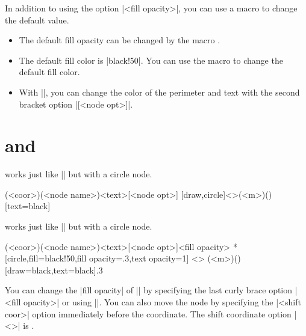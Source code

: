 \remark
In addition to using the option |{<fill opacity>}|, you can use a macro to change the default value.
\begin{itemize}
\item The default fill opacity can be changed by the macro \icmd{\settzfillopacity}.
\item
The default fill color is |black!50|. You can use the macro \icmd{\settzfillcolor} to change the default fill color.
\item With |\tznodeframe|, you can change the color of the perimeter and text with the second bracket option |[<node opt>]|.
\end{itemize}


\section{\protect\cmd{\tznodecircle} and \protect\cmd{\tznodecircle*}}
\label{s:tznodecircle}

\icmd{\tznodecircle} works just like |\tznodeframe| but with a circle node.

\begin{tzdef}
(<coor>)(<node name>){<text>}[<node opt>]
  [draw,circle]<>(<m>)(){}[text=black]
\end{tzdef}

\icmd{\tznodecircle*} works just like |\tznodeframe*| but with a circle node.

\begin{tzdef}
              (<coor>)(<node name>){<text>}[<node opt>]{<fill opacity>}
 *[circle,fill=black!50,fill opacity=.3,text opacity=1] <>
  (<m>)(){}[draw=black,text=black]{.3}
\end{tzdef}

\begin{tzcode}{.3}
{}
\end{tzcode}

You can change the |fill opacity| of |\tznodecircle*| by specifying the last curly brace option |{<fill opacity>}| or using |\settzfillopacity|. You can also move the node by specifying the |<shift coor>| option immediately before the coordinate.
The  shift coordinate option |<>| is .

